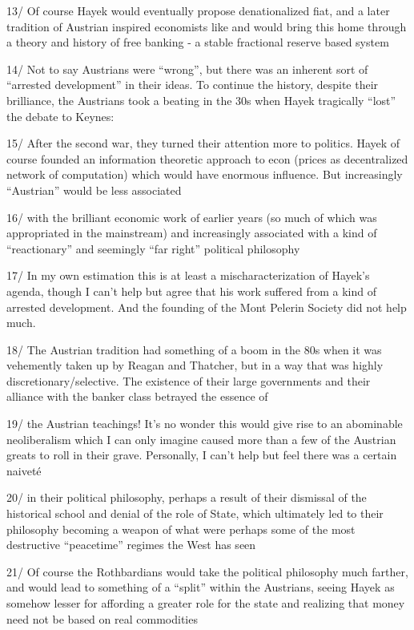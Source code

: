 \documentclass[
]{book}
\begin{document}
13/ Of course Hayek would eventually propose denationalized fiat, and a later tradition of Austrian inspired economists like \citet{GeorgeSelgin} and \citet{lawrencehwhite1} would bring this home through a theory and history of free banking - a stable fractional reserve based system

14/ Not to say Austrians were ``wrong'', but there was an inherent sort of ``arrested development'' in their ideas. To continue the history, despite their brilliance, the Austrians took a beating in the 30s when Hayek tragically ``lost'' the debate to Keynes:

15/ After the second war, they turned their attention more to politics. Hayek of course founded an information theoretic approach to econ (prices as decentralized network of computation) which would have enormous influence. But increasingly ``Austrian'' would be less associated

16/ with the brilliant economic work of earlier years (so much of which was appropriated in the mainstream) and increasingly associated with a kind of ``reactionary'' and seemingly ``far right'' political philosophy

17/ In my own estimation this is at least a mischaracterization of Hayek's agenda, though I can't help but agree that his work suffered from a kind of arrested development. And the founding of the Mont Pelerin Society did not help much.

18/ The Austrian tradition had something of a boom in the 80s when it was vehemently taken up by Reagan and Thatcher, but in a way that was highly discretionary/selective. The existence of their large governments and their alliance with the banker class betrayed the essence of

19/ the Austrian teachings! It's no wonder this would give rise to an abominable neoliberalism which I can only imagine caused more than a few of the Austrian greats to roll in their grave. Personally, I can't help but feel there was a certain naiveté

20/ in their political philosophy, perhaps a result of their dismissal of the historical school and denial of the role of State, which ultimately led to their philosophy becoming a weapon of what were perhaps some of the most destructive ``peacetime'' regimes the West has seen

21/ Of course the Rothbardians would take the political philosophy much farther, and would lead to something of a ``split'' within the Austrians, seeing Hayek as somehow lesser for affording a greater role for the state and realizing that money need not be based on real commodities
\end{document}
